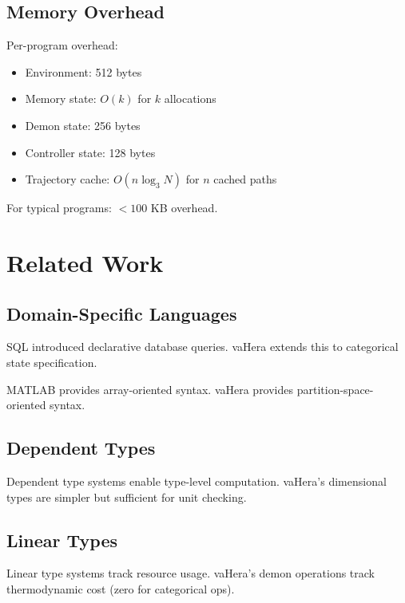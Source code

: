 \documentclass[twocolumn,10pt]{article}
\theoremstyle{definition}
\theoremstyle{remark}
\begin{document}
\subsection{Memory Overhead}

Per-program overhead:
\begin{itemize}
    \item Environment: 512 bytes
    \item Memory state: $O(k)$ for $k$ allocations
    \item Demon state: 256 bytes
    \item Controller state: 128 bytes
    \item Trajectory cache: $O(n \log_3 N)$ for $n$ cached paths
\end{itemize}

For typical programs: $< 100$ KB overhead.

\section{Related Work}
\label{sec:related}

\subsection{Domain-Specific Languages}

SQL \citep{chamberlin1974} introduced declarative database queries. vaHera extends this to categorical state specification.

MATLAB \citep{matlab2020} provides array-oriented syntax. vaHera provides partition-space-oriented syntax.

\subsection{Dependent Types}

Dependent type systems \citep{pierce2002} enable type-level computation. vaHera's dimensional types are simpler but sufficient for unit checking.

\subsection{Linear Types}

Linear type systems \citep{wadler1990} track resource usage. vaHera's demon operations track thermodynamic cost (zero for categorical ops).
\end{document}

